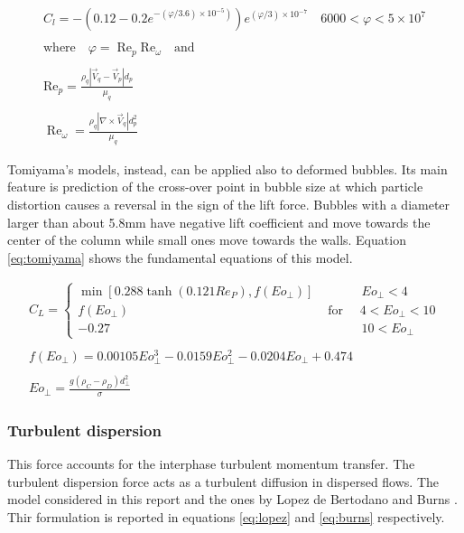 \documentclass[11pt,a4paper]{article}
\begin{document}
\begin{equation}
\begin{array}{l}
C_{l}=-\left(0.12-0.2 e^{\left.-(\varphi / 3.6) \times 10^{-5}\right)}\right) e^{(\varphi / 3) \times 10^{-7}} \quad 6000<\varphi<5 \times 10^{7}\\ \\
\text{where} \quad \varphi=\operatorname{Re}_{p} \mathrm{Re}_{\omega} \quad \text{and}	\\ \\
\mathrm{Re}_{p}=\frac{\rho_{q}\left|\vec{V}_{q}-\vec{V}_{p}\right| d_{p}}{\mu_{q}} \\ \\
\operatorname{Re}_{\omega}=\frac{\rho_{q}\left|\nabla \times \vec{V}_{q}\right| d_{p}^{2}}{\mu_{q}}
\end{array}
\label{eq:moraga}	
\end{equation}

Tomiyama's models, instead, can be applied also to deformed bubbles. Its main feature is prediction of the cross-over point in bubble size at which particle distortion causes a reversal in the sign of the lift force. Bubbles with a diameter larger than about 5.8mm have negative lift coefficient and move towards the center of the column while small ones move towards the walls. Equation \ref{eq:tomiyama} shows the fundamental equations of this model.


\begin{equation}
\begin{array}{l}
C_{L}=\left\{\begin{array}{llr}
\min \left[0.288 \tanh \left(0.121 R e_{P}\right), f\left(E o_{\perp}\right)\right] &  \quad\quad\quad E o_{\perp}< 4 \\
f\left(E o_{\perp}\right) & \text { for } \quad 4<E o_{\perp}<10 \\
-0.27 & \quad\quad\quad 10<E o_{\perp}
\end{array}\right.\\ \\
f\left(E o_{\perp}\right)=0.00105 E o_{\perp}^{3}-0.0159 E o_{\perp}^{2}-0.0204 E o_{\perp}+0.474\\ \\
E o_{\perp}=\frac{g\left(\rho_{C}-\rho_{D}\right) d_{\perp}^{2}}{\sigma}
\end{array}
\label{eq:tomiyama}
\end{equation}





\subsubsection{Turbulent dispersion}
This force accounts for the interphase turbulent momentum transfer. The turbulent dispersion force acts as a turbulent diffusion in dispersed flows. The model considered in this report and the ones by Lopez de Bertodano \cite{debertodano} and Burns \cite{burns}. Thir formulation is reported in equations \ref{eq:lopez} and \ref{eq:burns} respectively.
\end{document}
